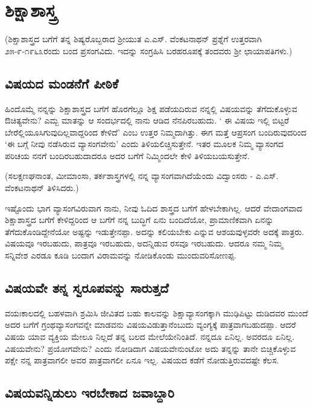\chapter{ಶಿಕ್ಷಾಶಾಸ್ತ್ರ}

(ಶಿಕ್ಷಾಶಾಸ್ತ್ರದ ಬಗೆಗೆ ತನ್ನ ಶಿಷ್ಯರೊಬ್ಬರಾದ ಶ್ರೀಯುತ ಎ.ಎಸ್. ವೆಂಕಟನಾಥನ್ ಪ್ರಶ್ನೆಗೆ ಉತ್ತರವಾಗಿ  ೨೫-೯-೧೯೬೩ರಂದು ಬಂದ ಪ್ರಸಂಗವಿದು. ಇದನ್ನು  ಸಂಗ್ರಹಿಸಿ ಬರಹರೂಪಕ್ಕೆ  ತಂದವರು ಶ್ರೀ ಛಾಯಾಪತಿಗಳು.)

\section*{ವಿಷಯದ ಮಂಡನೆಗೆ ಪೀಠಿಕೆ}

ಹಿಂದೊಮ್ಮೆ  ನನ್ನನ್ನು  ಶಿಕ್ಷಾಶಾಸ್ತ್ರದ ಬಗೆಗೆ ಹೊರಗೆಲ್ಲೂ   ಶಿಕ್ಷ ಪಡೆಯದಿರುವ ನನ್ನಲ್ಲಿ  ವಿಷಯವನ್ನು  ತೆಗೆದುಕೊಳ್ಳುವ ಔಚಿತ್ಯವೇನು? ಎಮ್ಬ ಮಾತನ್ನು  ಆ ಸಂದರ್ಭದಲ್ಲಿ  ನಾನು ಆಡಿದ ನೆನಪಿರಬಹುದು. ` ಈ ವಿಷಯ ಇಲ್ಲಿ ಬಿಟ್ಟರೆ ಬೇರೆಲ್ಲಿಯೂಸಿಗುವುದಿಲ್ಲವಾದ್ದರಿಂದ ಕೇಳಿದೆ'  ಎಂಬ ಉತ್ತರ ನಿಮ್ಮದಾಗಿತ್ತು. ಈಗ ಮತ್ತೆ ಆಪ್ರಸಂಗ ಬಂದಿರುವುದರಿಂದ   `ಈ ಬಗ್ಗೆ ನೀವು ನಡೆಸಿರುವ ವ್ಯಾಸಂಗವೇನು' ಎಂದು ತಿಳಿಯಲಿಚ್ಚಿಸುತ್ತೇನೆ.  ಇತರ ಮೂಲಕ ನಿಮ್ಮ ವ್ಯಾಸಂಗದ ಪರಿಚಯ ನನಗೆ ಬಂದಿರಬಹುದಾದರೂ ಅದರ ಬಗೆಗೆ ನಿಮ್ಮಿಂದಲೇ ಕೇಳಿ ತಿಳಿಯಬಯಸುತ್ತೇನೆ. 

(ಸಲಕ್ಷಣಘನಾಂತ, ಮೀಮಾಂಸಾ, ತರ್ಕಶಾಸ್ತ್ರಗಳಲ್ಲಿ ನನ್ನ ವ್ಯಾಸಂಗವಾಗಿದೆಯೆಂದು ವಿದ್ವಾಂಸರು - ಎ.ಎಸ್. ವೆಂಕಟನಾಥನ್ ತಿಳಿಸಿದರು.)

ಇಷ್ಟೊಂದು ಭಾಗ ವ್ಯಾಸಂಗವಿರುವಾಗ ನಾನು, ನೀವು ಓದಿದ ಶಾಸ್ತ್ರದ ಬಗೆಗೆ ಹೇಳಬೇಕಾಗಿಲ್ಲ. ಆದರೆ ವೇದಾಂಗವಾದ ಶಿಕ್ಷಾಶಾಸ್ತ್ರದ ಬಗೆಗೆ ಕೇಳಿದ್ದರಿಂದ ಆ ಬಗೆಗೆ ನನ್ನ ಬುದ್ಧಿಗೆ ಏನು ಬಂದಿದೆಯೋ, ಪ್ರಾಮಾಣಿಕವಾಗಿ ಏನನ್ನು  ತೆಗೆದುಕೊಂಡಿದ್ದೇನೆಯೋ ಅಷ್ಟನ್ನು ಇಡುತ್ತೇನಪ್ಪಾ. ಅದನ್ನು ಕಲಿಯಬೇಕು ಎನ್ನುವ ಆಶಯವುಳ್ಳವರೇ ಅದಕ್ಕೆ ಪಾತ್ರರು. ವಿಷಯವೂ ಇರಬಹುದು, ಪಾತ್ರವೂ  ಇರಬಹುದು, ಅದನ್ನಿಡುವ ರಸವೂ ಇರಬಹುದು. ಆದರೂ ನಮ್ಮ ನಿಮ್ಮ ಸನ್ನಿವೇಶ ಎರಡೂ ಕೂಡಿ ಬಂದಾಗ ವಿರಾಮವನ್ನು ನೋಡಿಕೊಂಡು ಮುಂದುವರಿಸೋಣಪ್ಪ.

\section*{ವಿಷಯವೇ ತನ್ನ ಸ್ವರೂಪವನ್ನು  ಸಾರುತ್ತದೆ}

ವಯಃಕಾಲದಲ್ಲಿ  ಬಹಳವಾಗಿ ಶ್ರಮಿಸಿ ಜೀವಿತದ ಬಹು ಕಾಲವನ್ನು  ಶಿಕ್ಷಾವ್ಯಾಸಂಗಕ್ಕಾಗಿ ಮುಢಿಪಿಟ್ಟು  ದುಡಿದವರ ಮುಂದೆ ಅದರ ಬಗೆಗೆ ಗ್ರಂಥವ್ಯಾಸಂಗವನ್ನೇ ಮಾಡವನು ವಿಷಯವಿಡುತ್ತಾನೆಂಬುದು ವ್ಯಂಗ್ಯಕ್ಕೆ  ಪಾತ್ರವಾಗಬಹುದಪ್ಪಾ. ಆದರೆ ವಿಷಯ ಯಾವ ವ್ಯಕ್ತಿಯ ಮೇಲೂ ನಿಲ್ಲದೆ ತನ್ನ ಬಲದ ಮೇಲೆಯೇನಿಂತಿದೆ. ನನ್ನದೂ ಏನಿಲ್ಲ. ಅವರದೂ ಏನಿಲ್ಲ. ವಿಷಯವೇನು? ಪ್ರಯೋಗವೇನು? ಎಂದು ನೋಡಿದಾಗ ವಿಷಯವೇನುಂಟೋ ಅದು ತನ್ನನ್ನು ತಾನೇ ಬಿಚ್ಚಿಕೊಳ್ಳುವ ಪಕ್ಷೇ ನನ್ನ ಪಾತ್ರವಾಗಲೀ ಅವರ ಪಾತ್ರವಾಗಲೀ ಏನೂ ಇಲ್ಲ. ವಿಷಯದ ಕಡೆಗೆ ನೋಡುತ್ತಿರುವದಷ್ಟೇ ಕೆಲಸ.

\section*{ವಿಷಯವನ್ನಿಡುಲು ಇರಬೇಕಾದ ಜವಾಬ್ದಾರಿ}

